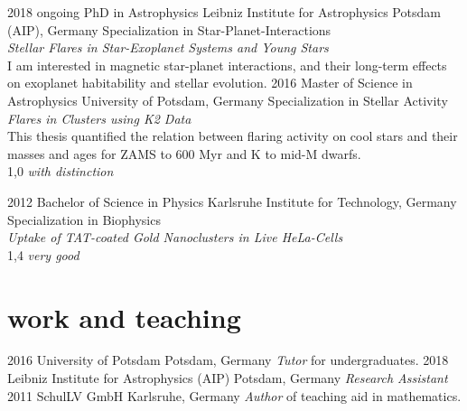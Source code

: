\documentclass[]{k-cv} %
\begin{document}
\begin{entrylist}
\entry
{2018 \to ongoing}
{PhD {\normalfont in Astrophysics}}
{Leibniz Institute for Astrophysics Potsdam (AIP), Germany}
{Specialization in Star-Planet-Interactions\\
\emph{Stellar Flares in Star-Exoplanet Systems and Young Stars} \\ I am interested in magnetic star-planet interactions, and their long-term effects on exoplanet habitability and stellar evolution.}
\entry
{2016 }
{Master {\normalfont of Science in Astrophysics}}
{University of Potsdam, Germany}
{Specialization in Stellar Activity\\
\emph{Flares in Clusters using K2 Data} \\ 
This thesis quantified the relation between flaring activity on cool stars and their masses and ages for ZAMS to 600 Myr and K to mid-M dwarfs.\\
1,0 \emph{with distinction}}


\entry
{2012 }
{Bachelor {\normalfont of Science in Physics}}
{Karlsruhe Institute for Technology, Germany}
{Specialization in Biophysics\\
\emph{Uptake of TAT-coated Gold Nanoclusters in Live HeLa-Cells}\\
1,4 \emph{very good}}
\end{entrylist}

\section{work and teaching}

\begin{entrylist}
\entry
{2016 }
{University of Potsdam}
{Potsdam, Germany}
{\emph{Tutor} for undergraduates.}
\entry
{2018}
{Leibniz Institute for Astrophysics (AIP)}
{Potsdam, Germany}
{\emph{Research Assistant}}
\entry
{2011 }
{SchulLV GmbH}
{Karlsruhe, Germany}
{\emph{Author} of teaching aid in mathematics.}
\end{entrylist}

\end{document}
